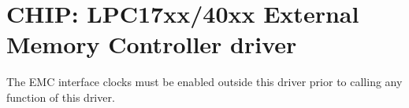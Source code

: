\hypertarget{group__EMC__17XX__40XX}{}\section{C\+H\+IP\+: L\+P\+C17xx/40xx External Memory Controller driver}
\label{group__EMC__17XX__40XX}
The E\+MC interface clocks must be enabled outside this driver prior to calling any function of this driver. 